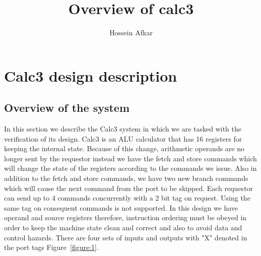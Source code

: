 \documentclass[a4paper, 11pt]{article}
\title{Overview of calc3}
\author{Hossein Afkar}
\begin{document}
\maketitle

\section{Calc3 design description}
\subsection{Overview of the system}
In this section we describe the Calc3 system in which we are tasked with the
verification of its design. Calc3 is an ALU calculator that has 16 registers
for keeping the internal state. Because of this change, arithmetic operands are
no longer sent by the requestor instead we have the fetch and store commands
which will change the state of the registers according to the commands we
issue. Also in addition to the fetch and store commands, we have two new branch
commands which will cause the next command from the port to be skipped. Each
requestor can send up to 4 commands concurrently with a 2 bit tag on request.
Using the same tag on consequent commands is not supported. In this design we
have operand and source registers therefore, instruction ordering must be 
obeyed in order to keep the machine state clean and correct and also to
avoid data and control hazards. There are four sets of inputs and outputs
with "X" denoted in the port tags Figure~\ref{figure:1}.
\end{document}
